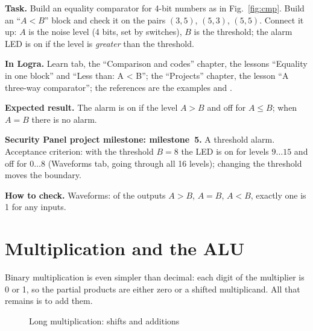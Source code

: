 \begin{diybox}
\textbf{Task.}  Build an equality comparator for 4-bit numbers as in
Fig.~\ref{fig:cmp}.  Build an ``$A<B$'' block and check it on the pairs
$(3,5)$, $(5,3)$, $(5,5)$.  Connect it up: $A$ is the noise level
(4 bits, set by switches), $B$ is the threshold; the alarm LED is on if the
level is \emph{greater} than the threshold.

\textbf{In Logra.} Learn tab, the ``Comparison and codes'' chapter, the lessons
``Equality in one block'' and ``Less than: A < B''; the ``Projects'' chapter, the
lesson ``A three-way comparator''; the references are the examples
 and .

\textbf{Expected result.} The alarm is on if the level $A>B$ and off for
$A\le B$; when $A=B$ there is no alarm.

\textbf{Security Panel project milestone: milestone~5.} A threshold alarm.
Acceptance criterion: with the threshold $B=8$ the LED is on for levels
$9\ldots 15$ and off for $0\ldots 8$ (Waveforms tab, going through all 16
levels); changing the threshold moves the boundary.

\textbf{How to check.} Waveforms: of the outputs $A>B$, $A=B$, $A<B$, exactly one
is 1 for any inputs.
\end{diybox}

\section{Multiplication and the ALU}

Binary multiplication is even simpler than decimal: each digit of the
multiplier is 0 or 1, so the partial products are either zero or a shifted
multiplicand. All that remains is to add them.

\begin{figure}[H]
\centering
{}
\caption{Long multiplication: shifts and additions}
\end{figure}

